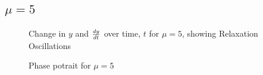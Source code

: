 \documentclass{article}
\begin{document}
\subsection{$\mu=5$}
\begin{figure}[H]
\centering 
\noindent{}%
\caption{Change in $y$ and $dy \over dt$  over time, $t$ for $\mu=5$, showing Relaxation Oscillations}
\end{figure}
\begin{figure}[H]
\centering 
\noindent{}%
\caption{Phase potrait for $\mu=5$}
\end{figure}
\end{document}
